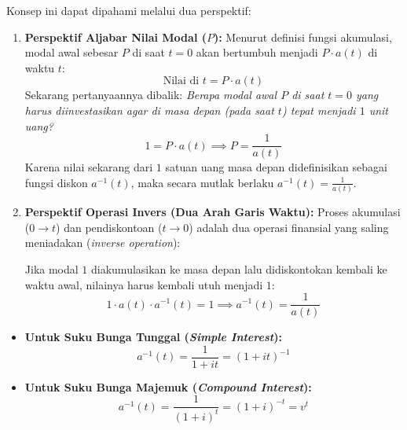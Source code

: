 \documentclass[11pt,a4paper]{article}
\begin{document}
\begin{notebox}[Mengapa Fungsi Diskon Berupa Resiprokal / Kebalikan: $a^{-1}(t) = \frac{1}{a(t)}$?]
Konsep ini dapat dipahami melalui dua perspektif:
\begin{enumerate}[label=\alph*.]
    \item \textbf{Perspektif Aljabar Nilai Modal ($P$):}
    Menurut definisi fungsi akumulasi, modal awal sebesar $P$ di saat $t = 0$ akan bertumbuh menjadi $P \cdot a(t)$ di waktu $t$:
    \begin{equation*}
        \text{Nilai di } t = P \cdot a(t)
    \end{equation*}
    Sekarang pertanyaannya dibalik: \emph{Berapa modal awal $P$ di saat $t = 0$ yang harus diinvestasikan agar di masa depan (pada saat $t$) tepat menjadi $1$ unit uang?}
    \begin{equation*}
        1 = P \cdot a(t) \implies P = \frac{1}{a(t)}
    \end{equation*}
    Karena nilai sekarang dari $1$ satuan uang masa depan didefinisikan sebagai fungsi diskon $a^{-1}(t)$, maka secara mutlak berlaku $a^{-1}(t) = \frac{1}{a(t)}$.

    \item \textbf{Perspektif Operasi Invers (Dua Arah Garis Waktu):}
    Proses akumulasi ($0 \to t$) dan pendiskontoan ($t \to 0$) adalah dua operasi finansial yang saling meniadakan (\emph{inverse operation}):
    \begin{center}
    \end{center}
    Jika modal $1$ diakumulasikan ke masa depan lalu didiskontokan kembali ke waktu awal, nilainya harus kembali utuh menjadi $1$:
    \begin{equation*}
        1 \cdot a(t) \cdot a^{-1}(t) = 1 \implies a^{-1}(t) = \frac{1}{a(t)}
    \end{equation*}
\end{enumerate}
\end{notebox}

\begin{itemize}[leftmargin=1.5em]
    \item \textbf{Untuk Suku Bunga Tunggal (\textit{Simple Interest}):}
    \begin{equation}
        a^{-1}(t) = \frac{1}{1 + it} = (1 + it)^{-1}
    \end{equation}
    \item \textbf{Untuk Suku Bunga Majemuk (\textit{Compound Interest}):}
    \begin{equation}
        a^{-1}(t) = \frac{1}{(1 + i)^t} = (1 + i)^{-t} = v^t
    \end{equation}
\end{itemize}
\end{document}
